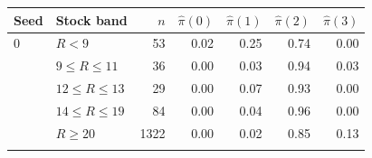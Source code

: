 \begin{tabular}{llrrrrr}
\toprule
Seed & Stock band & $n$ & $\hat\pi(0)$ & $\hat\pi(1)$ & $\hat\pi(2)$ & $\hat\pi(3)$ \\
\midrule
0 & $R<9$ & 53 & 0.02 & 0.25 & 0.74 & 0.00 \\
 & $9\le R\le 11$ & 36 & 0.00 & 0.03 & 0.94 & 0.03 \\
 & $12\le R\le 13$ & 29 & 0.00 & 0.07 & 0.93 & 0.00 \\
 & $14\le R\le 19$ & 84 & 0.00 & 0.04 & 0.96 & 0.00 \\
 & $R\ge 20$ & 1322 & 0.00 & 0.02 & 0.85 & 0.13 \\
\addlinespace
\bottomrule
\end{tabular}
